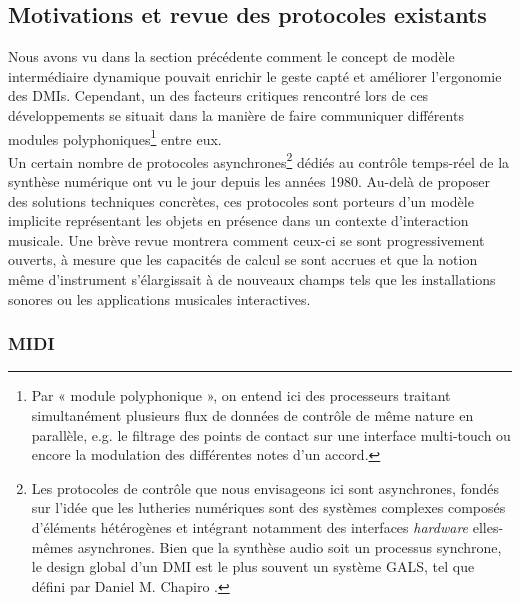 \subsection{Motivations et revue des protocoles existants}

\noindent Nous avons vu dans la section précédente comment le concept de modèle intermédiaire dynamique pouvait enrichir le geste capté et améliorer l’ergonomie des \glspl{DMI}. Cependant, un des facteurs critiques rencontré lors de ces développements se situait dans la manière de faire communiquer différents modules polyphoniques\footnote{Par « module polyphonique », on entend ici des processeurs traitant simultanément plusieurs flux de données de contrôle de même nature en parallèle, e.g. le filtrage des points de contact sur une interface multi-touch ou encore la modulation des différentes notes d'un accord.} entre eux.\\
\indent Un certain nombre de protocoles asynchrones\footnote{Les protocoles de contrôle que nous envisageons ici sont asynchrones, fondés sur l’idée que les lutheries numériques sont des systèmes complexes composés d’éléments hétérogènes et intégrant notamment des interfaces \textit{hardware} elles-mêmes asynchrones. Bien que la synthèse audio soit un processus synchrone, le design global d'un \gls{DMI} est le plus souvent un système \gls{GALS}, tel que défini par Daniel M. Chapiro \cite{chapiro_globally-asynchronous_1984}.} dédiés au contrôle temps-réel de la synthèse numérique ont vu le jour depuis les années 1980. Au-delà de proposer des solutions techniques concrètes, ces protocoles sont porteurs d’un modèle implicite représentant les objets en présence dans un contexte d'interaction musicale. Une brève revue montrera comment ceux-ci se sont progressivement ouverts, à mesure que les capacités de calcul se sont accrues et que la notion même d’instrument s’élargissait à de nouveaux champs tels que les installations sonores ou les applications musicales interactives.

\subsubsection{MIDI}

